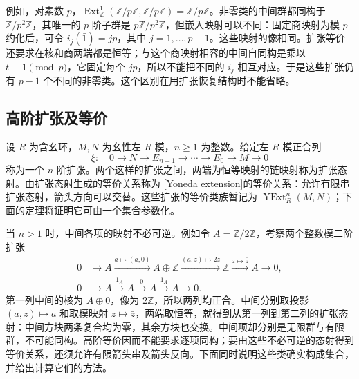 \ProseParagraphBreak
例如，对素数 \(p\)，\(\operatorname{Ext}_{\mathbb Z}^1(\mathbb Z/p\mathbb Z,\mathbb Z/p\mathbb Z)=\mathbb Z/p\mathbb Z\)。非零类的中间群都同构于 \(\mathbb Z/p^2\mathbb Z\)，其唯一的 \(p\) 阶子群是 \(p\mathbb Z/p^2\mathbb Z\)，但嵌入映射可以不同：固定商映射为模 \(p\) 约化后，可令 \(i_j(\bar1)=jp\)，其中 \(j=1,\ldots,p-1\)。这些映射的像相同。扩张等价还要求在核和商两端都是恒等；与这个商映射相容的中间自同构是乘以 \(t\equiv1\pmod p\)，它固定每个 \(jp\)，所以不能把不同的 \(i_j\) 相互对应。于是这些扩张仍有 \(p-1\) 个不同的非零类。这个区别在用扩张恢复结构时不能省略。

\subsection{高阶扩张及等价}
\label{b4:subsec:0901:02}

\begin{definition}\label{b4:def:higher-yoneda-extension}
	设 \(R\) 为含幺环，\(M,N\) 为幺性左 \(R\) 模，\(n\ge1\) 为整数。给定左 \(R\) 模正合列
	\[
		\xi:\quad 0\longrightarrow N\longrightarrow E_{n-1}\longrightarrow\cdots \longrightarrow E_0\longrightarrow M\longrightarrow0
	\]
	称为一个 \(n\) 阶扩张。两个这样的扩张之间，两端为恒等映射的链映射称为扩张态射。由扩张态射生成的等价关系称为 [Yoneda extension]的等价关系：允许有限串扩张态射，箭头方向可以交替。这些扩张的等价类族暂记为 \(\operatorname{YExt}_R^n(M,N)\)；下面的定理将证明它可由一个集合参数化。
\end{definition}

当 \(n>1\) 时，中间各项的映射不必可逆。例如令 \(A=\mathbb Z/2\mathbb Z\)，考察两个整数模二阶扩张
\[
	\begin{aligned}
		0&\longrightarrow A\xrightarrow{a\mapsto(a,0)}A\oplus\mathbb Z \xrightarrow{(a,z)\mapsto2z}\mathbb Z \xrightarrow{z\mapsto\bar z}A\longrightarrow0,\\
		0&\longrightarrow A\xrightarrow{1_A}A\xrightarrow{0}A \xrightarrow{1_A}A\longrightarrow0.
	\end{aligned}
\]
第一列中间的核为 \(A\oplus0\)，像为 \(2\mathbb Z\)，所以两列均正合。中间分别取投影 \((a,z)\mapsto a\) 和取模映射 \(z\mapsto\bar z\)，两端取恒等，就得到从第一列到第二列的扩张态射：中间方块两条复合均为零，其余方块也交换。中间项却分别是无限群与有限群，不可能同构。高阶等价因而不能要求逐项同构；要由这些不必可逆的态射得到等价关系，还须允许有限箭头串及箭头反向。下面同时说明这些类确实构成集合，并给出计算它们的方法。

